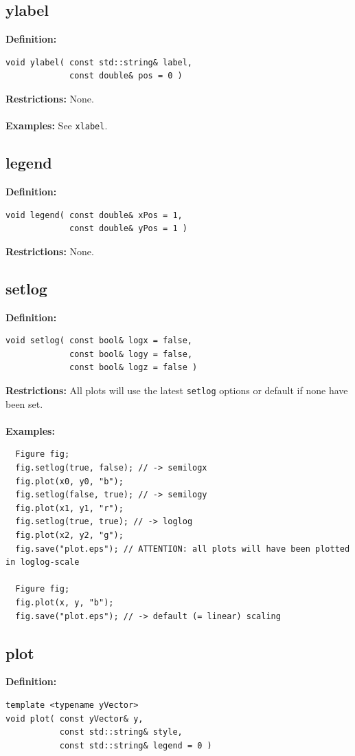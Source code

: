 \documentclass[a4paper]{article}
\newcommand{\command}[1]{\subsection{#1}}
\begin{document}
\newpage
\command{ylabel}

\textbf{Definition:}
\begin{lstlisting}
void ylabel( const std::string& label, 
             const double& pos = 0 )
\end{lstlisting}
%
\textbf{Restrictions:} None. \\ \\
%
\textbf{Examples:} See \texttt{xlabel}.

\command{legend}

\textbf{Definition:}
\begin{lstlisting}
void legend( const double& xPos = 1, 
             const double& yPos = 1 )
\end{lstlisting}
%
\textbf{Restrictions:} None. 

\command{setlog}

\textbf{Definition:}
\begin{lstlisting}
void setlog( const bool& logx = false, 
             const bool& logy = false,
             const bool& logz = false )
\end{lstlisting}
%
\textbf{Restrictions:} All plots will use the latest \texttt{setlog} options or default if none have been set. \\ \\
%
\textbf{Examples:}
\begin{lstlisting}
  Figure fig;
  fig.setlog(true, false); // -> semilogx
  fig.plot(x0, y0, "b"); 
  fig.setlog(false, true); // -> semilogy
  fig.plot(x1, y1, "r");
  fig.setlog(true, true); // -> loglog
  fig.plot(x2, y2, "g");
  fig.save("plot.eps"); // ATTENTION: all plots will have been plotted in loglog-scale 

  Figure fig;
  fig.plot(x, y, "b");
  fig.save("plot.eps"); // -> default (= linear) scaling
\end{lstlisting}

\newpage
\command{plot} 

\textbf{Definition:} 
\begin{lstlisting}
template <typename yVector>
void plot( const yVector& y, 
           const std::string& style, 
           const std::string& legend = 0 )
\end{lstlisting}
\end{document}
